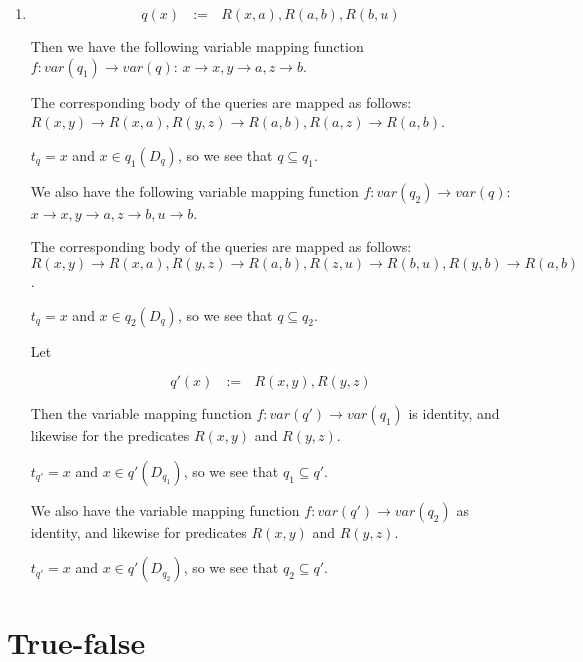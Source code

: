 \documentclass[12pt]{article}
\begin{document}
\begin{enumerate}
\pagebreak
\item %

\begin{displaymath}
q(x) \textrm{ } := \textrm{ } R(x,a),R(a,b),R(b,u)
\end{displaymath}

Then we have the following variable mapping function
$f: var(q_1) \rightarrow var(q)$:
$x \rightarrow x, y \rightarrow  a, z \rightarrow b$.

The corresponding body of the queries are mapped as follows:
$R(x,y) \rightarrow R(x,a), R(y,z) \rightarrow R(a,b),
R(a,z) \rightarrow R(a,b)$.

$t_q = x$ and $x \in q_1(D_q)$, so we see that $q \subseteq q_1$.

We also have the following variable mapping function
$f: var(q_2) \rightarrow var(q)$:
$x \rightarrow x, y \rightarrow a, z \rightarrow b, u \rightarrow b$.

The corresponding body of the queries are mapped as follows:
$R(x,y) \rightarrow R(x,a), R(y,z) \rightarrow R(a,b),
R(z,u) \rightarrow R(b,u), R(y,b) \rightarrow R(a,b)$.

$t_q = x$ and $x \in q_2(D_q)$, so we see that $q \subseteq q_2$.

Let

\begin{displaymath}
q'(x) \textrm{ } := \textrm{ } R(x,y),R(y,z)
\end{displaymath}

Then the variable mapping function $f: var(q') \rightarrow var(q_1)$ is
identity, and likewise for the predicates $R(x,y)$ and $R(y,z)$.

$t_{q'} = x$ and $x \in q'(D_{q_1})$, so we see that $q_1 \subseteq q'$.

We also have the variable mapping function $f: var(q') \rightarrow var(q_2)$
as identity, and likewise for predicates $R(x,y)$ and $R(y,z)$.

$t_{q'} = x$ and $x \in q'(D_{q_2})$, so we see that $q_2 \subseteq q'$.

\end{enumerate}

\section{True-false}
\end{document}
